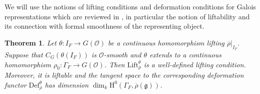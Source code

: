 \documentclass[11pt, letterpaper,english]{amsart}
\theoremstyle{plain}
\newtheorem{thm}[lem]{Theorem}
\theoremstyle{definition}
\numberwithin{equation}{section}
\numberwithin{lem}{section}
\newcommand{\fg}{\mathfrak{g}}
\newcommand{\cO}{\mathcal{O}}
\newcommand{\rhobar}{{\overline{\rho}}}
\newcommand{\gma}[1]{\Gamma_{#1}}
\newcommand{\cent}[2]{C_{#1}(#2)}
\begin{document}
We will use the notions of lifting conditions and deformation conditions for Galois representations which are reviewed in \cite[Definition 2.3]{Booher19}, in particular the notion of liftability and its connection with formal smoothness of the representing object.

\begin{thm} \label{thm:liftingcondition}
Let $\theta \colon I_F \to G(\cO)$ be a continuous homomorphism lifting $\rhobar|_{I_F}$.
Suppose that $\cent{G}{\theta(I_F)}$ is $\cO$-smooth and $\theta$ extends to a continuous homomorphism $\rho_0 \colon \Gamma_F \to G(\cO)$.  Then $\mathrm{Lift}_{\rhobar}^{\theta}$ is a well-defined lifting condition. Moreover, it is liftable and the tangent space to the corresponding deformation functor $\mathrm{Def}_{\rhobar}^{\theta}$ has dimension $\dim_{k} \mathrm{H}^0(\gma{F}, \rhobar(\fg))$. 
\end{thm}
\end{document}
